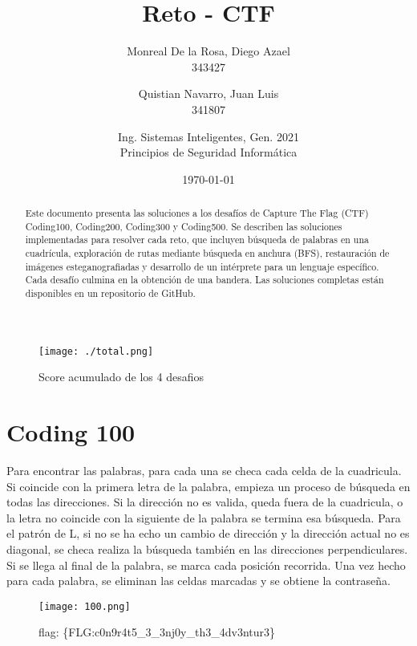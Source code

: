 \documentclass{article}
\title{Reto - CTF}
\author{
	Monreal De la Rosa, Diego Azael\\
	343427
	\and
	Quistian Navarro, Juan Luis\\
	341807
	\and
	Ing. Sistemas Inteligentes, Gen. 2021\\
	Principios de Seguridad Informática
}
\date{\today}
\begin{document}
\maketitle

\begin{abstract}
  Este documento presenta las soluciones a los desafíos de Capture The Flag (CTF) Coding100, Coding200, Coding300 y Coding500. Se describen las soluciones implementadas para resolver cada reto, que incluyen búsqueda de palabras en una cuadrícula, exploración de rutas mediante búsqueda en anchura (BFS), restauración de imágenes esteganografiadas y desarrollo de un intérprete para un lenguaje específico. Cada desafío culmina en la obtención de una bandera. Las soluciones completas están disponibles en un repositorio de GitHub.
\end{abstract}

\begin{figure}[H]
  \centering
  \texttt{[image: ./total.png]}
  \caption{Score acumulado de los 4 desafios}
\end{figure}

\newpage
\section*{Coding 100}

Para encontrar las palabras, para cada una se checa cada celda de la cuadricula. Si coincide con la primera letra de la palabra, empieza un proceso de búsqueda en todas las direcciones. Si la dirección no es valida, queda fuera de la cuadricula, o la letra no coincide con la siguiente de la palabra se termina esa búsqueda. Para el patrón de L, si no se ha echo un cambio de dirección y la dirección actual no es diagonal, se checa realiza la búsqueda también en las direcciones perpendiculares. Si se llega al final de la palabra, se marca cada posición recorrida. Una vez hecho para cada palabra, se eliminan las celdas marcadas y se obtiene la contraseña.

\begin{figure}[H]
  \centering
  \texttt{[image: 100.png]}
  \caption{flag: \{FLG:c0n9r4t5\_3\_3nj0y\_th3\_4dv3ntur3\}}
\end{figure}
\end{document}
